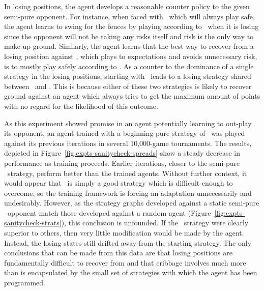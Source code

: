 In losing positions,
the agent develops a reasonable counter policy
to the given semi-pure opponent.
%
For instance,
when faced with \handmaxmin\ which will always play safe,
the agent learns to swing for the fences by playing according to \handmaxposs\ 
when it is losing
since the opponent will not be taking any risks itself
and risk is the only way to make up ground.
%
Similarly,
the agent learns that the best way to recover from a losing position
against \handmaxavg,
which plays to expectations and avoids unnecessary risk,
is to mostly play safely according to \handmaxmin.
%
As a counter to the dominance of a single strategy in the losing positions,
starting with \handmaxposs\ leads to a losing strategy
shared between \handmaxavg\ and \handmaxmed.
%
This is because either of these two strategies is likely to recover ground
against an agent which always tries to get the maximum amount of points
with no regard for the likelihood of this outcome.



As this experiment showed promise in an agent potentially learning
to out-play its opponent,
an agent trained with a beginning pure strategy of \handmaxavg\ was played
against its previous iterations in several 10,000-game tournaments.
%
The results,
depicted in Figure~\ref{fig:expts-sanitycheck-spreads}
show a steady decrease in performance as training proceeds.
%
Earlier iterations,
closer to the semi-pure \handmaxavg\ strategy,
perform better than the trained agents.
%
Without further context,
it would appear that \handmaxavg\ is simply a good strategy which is difficult
enough to overcome,
so the training framework is forcing an adaptation
unnecessarily and undesirably.
%
However,
as the strategy graphs developed against a static semi-pure \handmaxavg\ 
opponent match those developed against a random agent
(Figure~\ref{fig:expts-sanitycheck-strats}),
this conclusion is unfounded.
%
If the \handmaxavg\ strategy were clearly superior to others,
then very little modification would be made by the agent.
%
Instead,
the losing states still drifted away from the starting strategy.
%
The only conclusions that can be made from this data are that
losing positions are fundamentally difficult to recover from
and that
cribbage involves much more than is encapsulated by the small set of
strategies with which the agent has been programmed.



